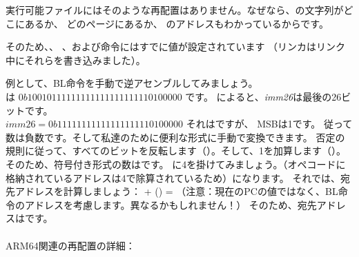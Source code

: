 実行可能ファイルにはそのような再配置はありません。なぜなら、の文字列がどこにあるか、
どのページにあるか、 \puts のアドレスもわかっているからです。

そのため、、 \ADD 、および命令にはすでに値が設定されています
（リンカはリンク中にそれらを書き込みました）。




例として、BL命令を手動で逆アセンブルしてみましょう。\\
は $0b10010111111111111111111110100000$ です。 
 によると、\emph{imm26}は最後の26ビットです。\\
$imm26 = 0b11111111111111111110100000$
それはですが、 \ac{MSB}は1です。
従って数は負数です。そして私達のために便利な形式に手動で変換できます。
否定の規則に従って、すべてのビットを反転します（）。そして、1を加算します（）。
そのため、符号付き形式の数はです。 
に4を掛けてみましょう。（オペコードに格納されているアドレスは4で除算されているため）になります。 
それでは、宛先アドレスを計算しましょう： + () = 
（注意：現在の\ac{PC}の値ではなく、BL命令のアドレスを考慮します。異なるかもしれません！）
 そのため、宛先アドレスはです。\\
\\
ARM64関連の再配置の詳細： \ARMELF
